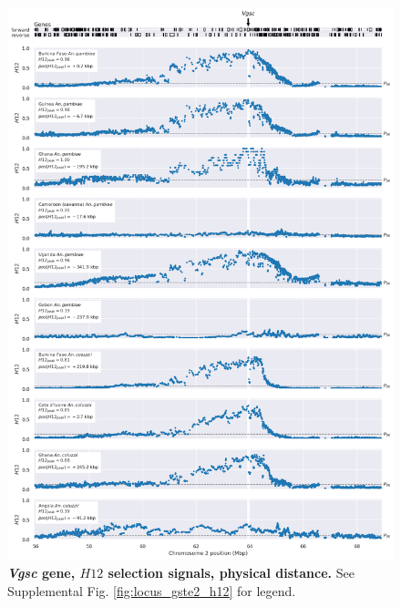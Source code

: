 \documentclass[a4paper,11pt,abstracton,hidelinks]{scrartcl}
\begin{document}
\clearpage


\begin{figure}[t!]
	\begin{center}
		\includegraphics*[width=1\linewidth,center]{artwork/locus_vgsc_h12_pdist.png}
	\end{center}
	\caption[\textit{Vgsc} gene, $H12$ selection signals, physical distance]{
	\textbf{\textit{Vgsc} gene, $H12$ selection signals, physical distance.}
	See Supplemental Fig. \ref{fig:locus_gste2_h12} for legend.
	} 
	\label{fig:locus_vgsc_h12_pdist}
\end{figure}


\clearpage
\end{document}
